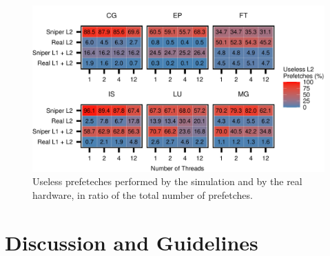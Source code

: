 \documentclass[AMA,final,STIX1COL]{WileyNJD-v2}
\newcommand{\vsg}[1]{\textcolor{blue}{\bfseries \ul{vsgirelli: #1} }\vspace{0.2cm}}
\begin{document}






\begin{figure}
    \centering
    \includegraphics[width=\linewidth]{figures/fig10.pdf}
    \caption{Useless prefeteches performed by the simulation and by the real hardware, in ratio of the total number of prefetches.}
    \label{fig:sniper_useless_pf_ratio}
\end{figure}









\section{Discussion and Guidelines}\label{sec:insights}
\end{document}
